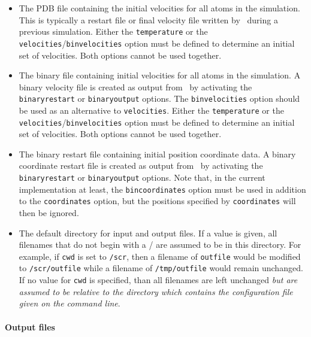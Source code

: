 \begin{itemize}
\item
{}
{\label{param:velocities}
The PDB file containing the initial velocities for all 
atoms in the simulation.  
This is typically a restart file or final velocity file written 
by \NAMD\ during a previous simulation.  
Either the {\tt temperature} 
or the {\tt velocities}/{\tt binvelocities} 
option must be defined to determine an initial set of velocities.  
Both options cannot be used together.}

\item
{}
{\label{param:binvelocities}
The binary file containing initial velocities for all 
atoms in the simulation.  
A binary velocity file is created as output from \NAMD\ 
by activating the {\tt binaryrestart} or {\tt binaryoutput} options.  
The {\tt binvelocities} option should be used as 
an alternative to {\tt velocities}.  
Either the {\tt temperature} 
or the {\tt velocities}/{\tt binvelocities} 
option must be defined to determine an initial set of velocities.  
Both options cannot be used together.  
}

\item
{}
{
The binary restart file containing initial position 
coordinate data.  
A binary coordinate restart file is created as output from \NAMD\ 
by activating the {\tt binaryrestart} or {\tt binaryoutput} options.  
Note that, in the current implementation at least, 
the {\tt bincoordinates} option must be used in addition 
to the {\tt coordinates} option, 
but the positions specified by {\tt coordinates} will then be ignored.  
}

\item
{}
{The default directory for input and output files.  
If a value is given, all filenames that 
do not begin with a / are assumed to be in this directory.  
For example, if {\tt cwd} is set to {\tt /scr}, then a
filename of {\tt outfile} would be modified to {\tt /scr/outfile}
while a filename of {\tt /tmp/outfile} would remain unchanged.
If no value for {\tt cwd} is specified, than all filenames are 
left unchanged {\em but are assumed to be relative to the directory
which contains the configuration file given on the command line}.}

\end{itemize}

\paragraph{Output files}


